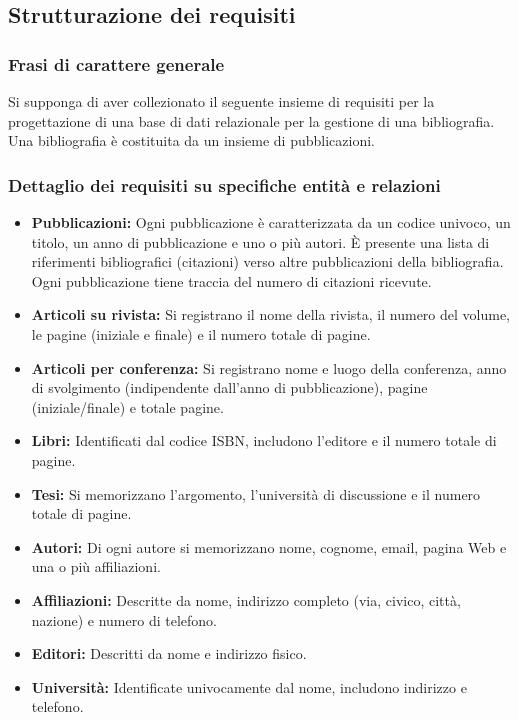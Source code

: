 \documentclass[a4paper,12pt]{article}
\begin{document}
\subsection{Strutturazione dei requisiti}
\label{sec:strutturazione}
\subsubsection{Frasi di carattere generale}
Si supponga di aver collezionato il seguente insieme di requisiti per la progettazione di una base di dati relazionale per la gestione di una bibliografia. Una bibliografia è costituita da un insieme di pubblicazioni.

\subsubsection{Dettaglio dei requisiti su specifiche entità e relazioni}
\begin{itemize}[label=\textbullet]
    \item \textbf{Pubblicazioni:} Ogni pubblicazione è caratterizzata da un codice univoco, un titolo, un anno di pubblicazione e uno o più autori. È presente una lista di riferimenti bibliografici (citazioni) verso altre pubblicazioni della bibliografia. Ogni pubblicazione tiene traccia del numero di citazioni ricevute.
    
    \item \textbf{Articoli su rivista:} Si registrano il nome della rivista, il numero del volume, le pagine (iniziale e finale) e il numero totale di pagine.
    
    \item \textbf{Articoli per conferenza:} Si registrano nome e luogo della conferenza, anno di svolgimento (indipendente dall'anno di pubblicazione), pagine (iniziale/finale) e totale pagine.
    
    \item \textbf{Libri:} Identificati dal codice ISBN, includono l'editore e il numero totale di pagine.
    
    \item \textbf{Tesi:} Si memorizzano l'argomento, l'università di discussione e il numero totale di pagine.
    
    \item \textbf{Autori:} Di ogni autore si memorizzano nome, cognome, email, pagina Web e una o più affiliazioni.
    
    \item \textbf{Affiliazioni:} Descritte da nome, indirizzo completo (via, civico, città, nazione) e numero di telefono.
    
    \item \textbf{Editori:} Descritti da nome e indirizzo fisico.
    
    \item \textbf{Università:} Identificate univocamente dal nome, includono indirizzo e telefono.
\end{itemize}
\end{document}
